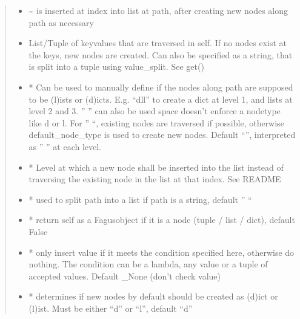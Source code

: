 \documentclass[a4paper,10pt,english]{sphinxmanual}
\begin{document}
\begin{fulllineitems}
\begin{fulllineitems}
\begin{quote}
\begin{description}
\begin{itemize}
\item {}
\sphinxAtStartPar
{} \textendash{} \textasciitilde{} is inserted at index into list at path, after creating new nodes along path as necessary

\item {}
\sphinxAtStartPar
{} \textendash{} List/Tuple of key\sphinxhyphen{}values that are traversed in self. If no nodes exist at the keys, new nodes are
created. Can also be specified as a string, that is split into a tuple using value\_split. See get()

\item {}
\sphinxAtStartPar
{} \textendash{} * Can be used to manually define if the nodes along path are supposed to be (l)ists or
(d)icts. E.g. “dll” to create a dict at level 1, and lists at level 2 and 3. ” ” can also be used \sphinxhyphen{}
space doesn’t enforce a node\sphinxhyphen{}type like d or l. For ” “, existing nodes are traversed if possible,
otherwise default\_node\_type is used to create new nodes. Default “”, interpreted as ” ” at each level.

\item {}
\sphinxAtStartPar
{} \textendash{} * Level at which a new node shall be inserted into the list instead of traversing the
existing node in the list at that index. See README

\item {}
\sphinxAtStartPar
{} \textendash{} * used to split path into a list if path is a string, default ” “

\item {}
\sphinxAtStartPar
{} \textendash{} * return self as a Fagus\sphinxhyphen{}object if it is a node (tuple / list / dict), default False

\item {}
\sphinxAtStartPar
{} \textendash{} * only insert value if it meets the condition specified here, otherwise do nothing. The condition can
be a lambda, any value or a tuple of accepted values. Default \_None (don’t check value)

\item {}
\sphinxAtStartPar
{} \textendash{} * determines if new nodes by default should be created as (d)ict or (l)ist. Must be
either “d” or “l”, default “d”


\end{itemize}
\end{description}
\end{quote}
\end{fulllineitems}
\end{fulllineitems}
\end{document}
